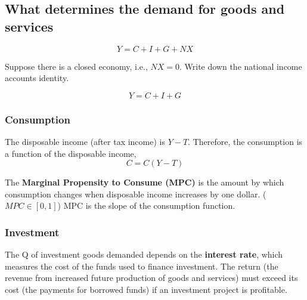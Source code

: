 \documentclass[12pt]{article}
\begin{document}
\subsection{What determines the demand for goods and services}

\begin{equation*}
Y = C + I + G + NX
\end{equation*}

Suppose there is a closed economy, i.e., $ NX = 0 $. Write down the national income 
accounts identity.

\begin{equation*}
Y = C + I + G
\end{equation*}

\subsubsection{Consumption}
The disposable income (after tax income) is $ Y - T $. Therefore, the consumption is
a function of the disposable income,
\begin{equation*}
C = C(Y - T)
\end{equation*}

The {\textbf {Marginal Propensity to Consume (MPC)}} is the amount by which consumption
changes when disposable income increases by one dollar. ($ MPC \in [0,1] $)
MPC is the slope of the consumption function.

\begin{figure}[H]
\end{figure}

\subsubsection{Investment}
The Q of investment goods demanded depends on the {\textbf {interest rate}}, which
measures the cost of the funds used to finance investment. The return (the revenue
from increased future production of goods and services) must exceed its cost (the 
payments for borrowed funds) if an investment project is profitable.
\end{document}
